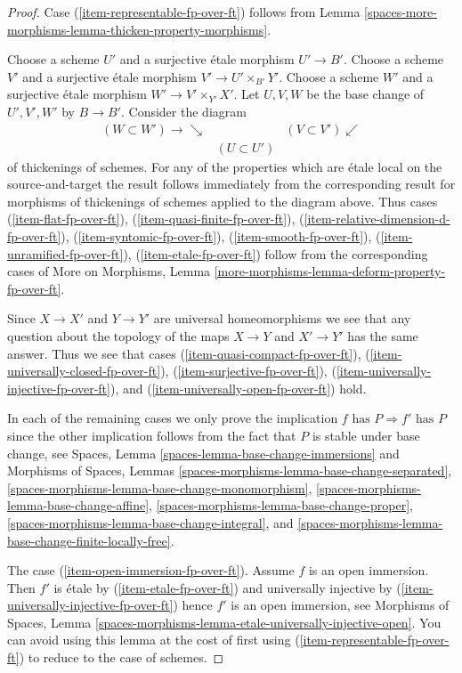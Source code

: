 \begin{proof}
Case (\ref{item-representable-fp-over-ft}) follows from
Lemma \ref{spaces-more-morphisms-lemma-thicken-property-morphisms}.

\medskip\noindent
Choose a scheme $U'$ and a surjective \'etale morphism $U' \to B'$.
Choose a scheme $V'$ and a surjective \'etale morphism
$V' \to U' \times_{B'} Y'$.
Choose a scheme $W'$ and a surjective \'etale morphism
$W' \to V' \times_{Y'} X'$. Let $U, V, W$ be the base change
of $U', V', W'$ by $B \to B'$. Consider the diagram
$$
\begin{array}{ccc}(W \subset W') \longrightarrow\searrow &  & (V \subset V') \swarrow \\  & (U \subset U') & \end{array}
$$
of thickenings of schemes. For any of the properties which are
\'etale local on the source-and-target the result follows immediately
from the corresponding result for morphisms of thickenings of schemes
applied to the diagram above. Thus cases
(\ref{item-flat-fp-over-ft}),
(\ref{item-quasi-finite-fp-over-ft}),
(\ref{item-relative-dimension-d-fp-over-ft}),
(\ref{item-syntomic-fp-over-ft}),
(\ref{item-smooth-fp-over-ft}),
(\ref{item-unramified-fp-over-ft}),
(\ref{item-etale-fp-over-ft})
follow from the corresponding cases of
More on Morphisms, Lemma \ref{more-morphisms-lemma-deform-property-fp-over-ft}.

\medskip\noindent
Since $X \to X'$ and $Y \to Y'$ are universal homeomorphisms
we see that any question about the topology of the maps
$X \to Y$ and $X' \to Y'$ has the same answer. Thus we see
that cases (\ref{item-quasi-compact-fp-over-ft}),
(\ref{item-universally-closed-fp-over-ft}),
(\ref{item-surjective-fp-over-ft}),
(\ref{item-universally-injective-fp-over-ft}), and
(\ref{item-universally-open-fp-over-ft}) hold.

\medskip\noindent
In each of the remaining cases we only prove the implication
$f\text{ has }P \Rightarrow f'\text{ has }P$ since the other
implication follows from the fact that $P$ is stable under
base change, see
Spaces, Lemma \ref{spaces-lemma-base-change-immersions} and
Morphisms of Spaces, Lemmas
\ref{spaces-morphisms-lemma-base-change-separated},
\ref{spaces-morphisms-lemma-base-change-monomorphism},
\ref{spaces-morphisms-lemma-base-change-affine},
\ref{spaces-morphisms-lemma-base-change-proper},
\ref{spaces-morphisms-lemma-base-change-integral}, and
\ref{spaces-morphisms-lemma-base-change-finite-locally-free}.

\medskip\noindent
The case (\ref{item-open-immersion-fp-over-ft}).
Assume $f$ is an open immersion.
Then $f'$ is \'etale by (\ref{item-etale-fp-over-ft}) and universally injective
by (\ref{item-universally-injective-fp-over-ft})
hence $f'$ is an open immersion, see
Morphisms of Spaces, Lemma
\ref{spaces-morphisms-lemma-etale-universally-injective-open}.
You can avoid using this lemma at the cost of first
using (\ref{item-representable-fp-over-ft}) to reduce to the case of schemes.


\end{proof}
